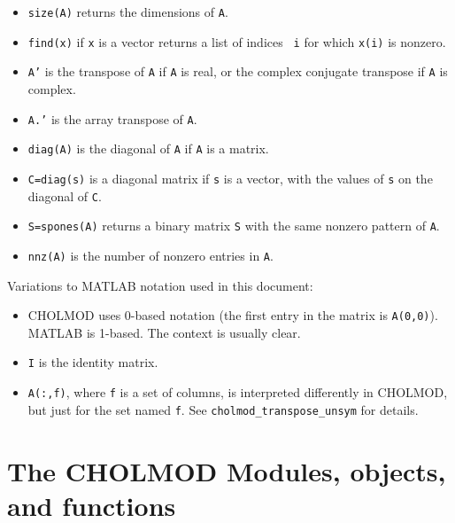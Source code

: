 \documentclass[11pt]{article}
\begin{document}
\begin{itemize}
    \item {\tt size(A)} returns the dimensions of {\tt A}.

    \item {\tt find(x)} if {\tt x} is a vector returns a list of indices {\tt
        i} for which {\tt x(i)} is nonzero.

    \item {\tt A'} is the transpose of {\tt A} if {\tt A} is real, or the
        complex conjugate transpose if {\tt A} is complex.

    \item {\tt A.'} is the array transpose of {\tt A}.

    \item {\tt diag(A)} is the diagonal of {\tt A} if {\tt A} is a matrix.

    \item {\tt C=diag(s)} is a diagonal matrix if {\tt s} is a vector,
        with the values of {\tt s} on the diagonal of {\tt C}.

    \item {\tt S=spones(A)} returns a binary matrix {\tt S} with the
        same nonzero pattern of {\tt A}.

    \item {\tt nnz(A)} is the number of nonzero entries in {\tt A}.

\end{itemize}

\noindent Variations to MATLAB notation used in this document:
\begin{itemize}
    \item CHOLMOD uses 0-based notation (the first entry in the matrix is
        {\tt A(0,0)}).  MATLAB is 1-based.  The context is usually clear.
    \item {\tt I} is the identity matrix.
    \item {\tt A(:,f)}, where {\tt f} is a set of columns, is interpreted
        differently in CHOLMOD, but just for the set named {\tt f}.
        See {\tt cholmod\_transpose\_unsym} for details.
\end{itemize}


\newpage \section{The CHOLMOD Modules, objects, and functions}
\label{Modules}
\end{document}
